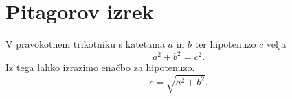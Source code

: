 \documentclass{article}
\begin{document}
\section*{Pitagorov izrek}
V pravokotnem trikotniku s katetama \(a\) in \(b\) ter hipotenuzo \(c\) velja
\[ a^2 + b^2 = c^2 . \]
Iz tega lahko izrazimo enačbo za hipotenuzo.
\[c = \sqrt{a^2 + b^2} .\]
\end{document}
